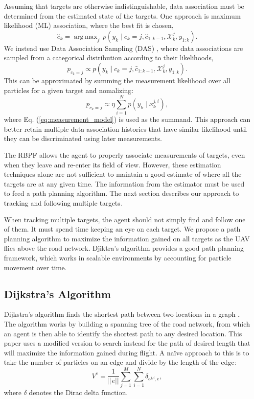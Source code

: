 \documentclass[letterpaper, 10 pt, conference]{ieeeconf}  %
\DeclareMathOperator*{\argmax}{arg\,max}
\begin{document}
Assuming that targets are otherwise indistinguishable, data association must be determined from the estimated state of the targets. One approach is maximum likelihood (ML) association, where the best fit is chosen,
\begin{equation}%
    \hat{c}_k = \argmax_{j} \, p(y_k \mid c_k = j, \hat{c}_{1:k-1}, \mathcal{X}^{j}_{k}, y_{1:k}).
\end{equation}
We instead use Data Association Sampling (DAS) \cite{Thrun2006}, where data associations are sampled from a categorical distribution according to their likelihoods,
\begin{equation}%
    p_{c_k=j} \propto p(y_k \mid c_k=j, \hat{c}_{1:k-1}, \mathcal{X}^{j}_{k}, y_{1:k}).
\end{equation}
This can be approximated by summing the measurement likelihood over all particles for a given target and nomalizing:
\begin{equation}%
    p_{c_k=j} \approx \eta \sum_{i=1}^{N} p(y_k \mid x_k^{j, i}),
\end{equation}
where Eq. (\ref{eq:measurement_model}) is used as the summand. This approach can better retain multiple data association histories that have similar likelihood until they can be discriminated using later measurements.

The RBPF allows the agent to properly associate measurements of targets, even when they leave and re-enter its field of view. However, these estimation techniques alone are not sufficient to maintain a good estimate of where all the targets are at any given time. The information from the estimator must be used to feed a path planning algorithm. The next section describes our approach to tracking and following multiple targets.

When tracking multiple targets, the agent should not simply find and follow one of them. It must spend time keeping an eye on each target. We propose a path planning algorithm to maximize the information gained on all targets as the UAV flies above the road network. Djiktra's algorithm provides a good path planning framework, which works in scalable environments by accounting for particle movement over time.

\subsection{Dijkstra's Algorithm}
Dijkstra's algorithm finds the shortest path between two locations in a graph \cite{skiena1998algorithm}. The algorithm works by building a spanning tree of the road network, from which an agent is then able to identify the shortest path to any desired location. This paper uses a modified version to search instead for the path of desired length that will maximize the information gained during flight. A na\"ive approach to this is to take the number of particles on an edge and divide by the length of the edge:
\begin{equation}\label{eq:simple_val}
V^{e} = \frac{1}{||e||}\sum_{j=1}^M \sum_{i=1}^{N}\delta_{e^{j,i},e},
\end{equation}
where $\delta$ denotes the Dirac delta function.
\end{document}
